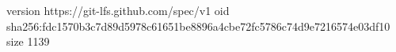 version https://git-lfs.github.com/spec/v1
oid sha256:fdc1570b3c7d89d5978c61651be8896a4cbe72fc5786c74d9e7216574e03df10
size 1139
